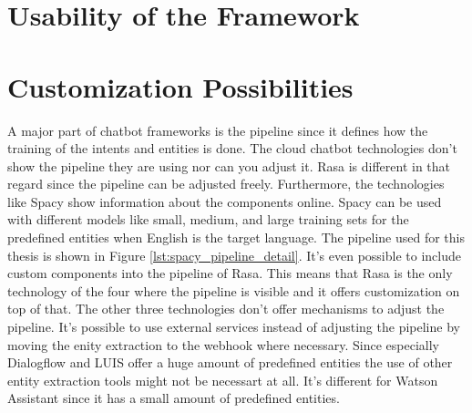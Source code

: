 \section*{Usability of the Framework}



\section*{Customization Possibilities}
A major part of chatbot frameworks is the pipeline since it defines how the 
training of the intents and entities is done.
The cloud chatbot technologies don't show the pipeline they are using nor can you 
adjust it.
Rasa is different in that regard since the pipeline can be adjusted freely.
Furthermore, the technologies like Spacy show information about the components 
online.
Spacy can be used with different models like small, medium, and large training sets 
for the predefined entities when English is the target language.
The pipeline used for this thesis is shown in Figure \ref{lst:spacy_pipeline_detail}.
It's even possible to include custom components into the pipeline of Rasa.
This means that Rasa is the only technology of the four where the pipeline is visible 
and it offers customization on top of that.
The other three technologies don't offer mechanisms to adjust the pipeline.
It's possible to use external services instead of adjusting the pipeline by 
moving the enity extraction to the webhook where necessary.
Since especially Dialogflow and LUIS offer a huge amount of predefined entities 
the use of other entity extraction tools might not be necessart at all.
It's different for Watson Assistant since it has a small amount of predefined entities.

